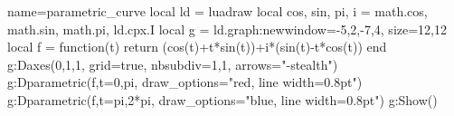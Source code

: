 \documentclass{standalone}%
\begin{document}
\begin{luadraw}{name=parametric_curve}
local ld = luadraw
local cos, sin, pi, i = math.cos, math.sin, math.pi, ld.cpx.I
local g = ld.graph:new{window={-5,2,-7,4}, size={12,12}}
local f = function(t) return (cos(t)+t*sin(t))+i*(sin(t)-t*cos(t)) end
g:Daxes({0,1,1}, {grid=true, nbsubdiv={1,1}, arrows="-stealth"})
g:Dparametric(f,{t={0,pi}, draw_options="red, line width=0.8pt"})
g:Dparametric(f,{t={pi,2*pi}, draw_options="blue, line width=0.8pt"})
g:Show()
\end{luadraw}
\end{document}
